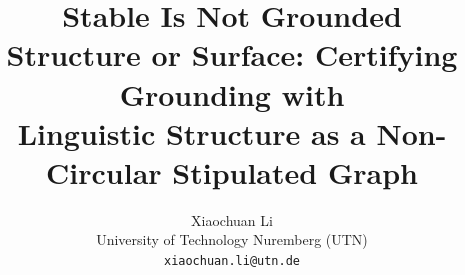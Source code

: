 \newcommand{\U}{\texttt{U}}
\newcommand{\SW}{\texttt{SW}}
\newcommand{\SC}{\texttt{SC}}
\newcommand{\scg}{\texttt{SC-grounded}}
\newcommand{\scs}{\texttt{SC-spurious}}
\newcommand{\scu}{\texttt{SC-unresolved}}
\newcommand{\swsc}{\texttt{SW-shortcut}}
\newcommand{\doc}{\texttt{do(class-3)}}
\newcommand{\dctwo}{\texttt{do(class-2)}}
\newcommand{\Mstr}{\texttt{M}}
\newcommand{\col}{\texttt{color}}
\newcommand{\nam}{\texttt{name}}
\newcommand{\subsetstrict}{\supsetneq}  %

\title{Stable Is Not Grounded\\[2pt]
\large Structure or Surface: Certifying Grounding with\\
Linguistic Structure as a Non-Circular Stipulated Graph}

\author{Xiaochuan Li \\
  University of Technology Nuremberg (UTN) \\
  \texttt{xiaochuan.li@utn.de}}


\maketitle

